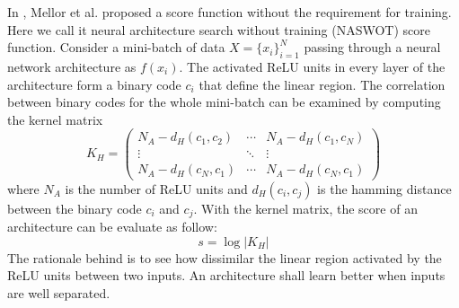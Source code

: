 \documentclass[sigconf]{acmart}
\begin{document}
    In \cite{https://doi.org/10.48550/arxiv.2006.04647}, Mellor et al. proposed a 
    score function without the requirement for training. Here we call it neural 
    architecture search without training (NASWOT) score function. 
    Consider a mini-batch of data $X=\{x_i\}^N_{i=1}$ passing through a neural network 
    architecture as $f(x_i)$. The activated ReLU units in every layer of the architecture 
    form a binary code $c_i$ that define the linear region.
    The correlation between binary codes for the whole mini-batch can be examined 
    by computing the kernel matrix %
    \begin{equation}
        K_H=\begin{pmatrix}N_A-d_H(c_1,c_2)&\cdots&N_A-d_H(c_1,c_N)\\\vdots&\ddots&\vdots\\N_A-d_H(c_N,c_1)&\cdots&N_A-d_H(c_N,c_1)\end{pmatrix}
    \end{equation}
    where $N_A$ is the number of ReLU units and $d_H(c_i,c_j)$ is the hamming 
    distance between the binary code $c_i$ and $c_j$. 
    With the kernel matrix, the score of an architecture can be evaluate as 
    follow: 
    \begin{equation}
        s=\log\lvert K_H\rvert
    \end{equation}
    The rationale behind is to see how dissimilar the linear region activated by 
    the ReLU units between two inputs. An architecture shall learn better 
    when inputs are well separated.
	
\end{document}

